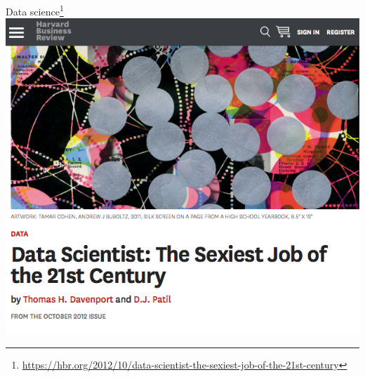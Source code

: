 \documentclass{beamer}\usepackage[]{graphicx}\usepackage[]{color}
\begin{document}
\begin{frame}{Data science\footnote{\scriptsize\url{https://hbr.org/2012/10/data-scientist-the-sexiest-job-of-the-21st-century}}}
	\centering
	\includegraphics[scale=0.35]{figure/hbr.png}	
\end{frame}
\end{document}
